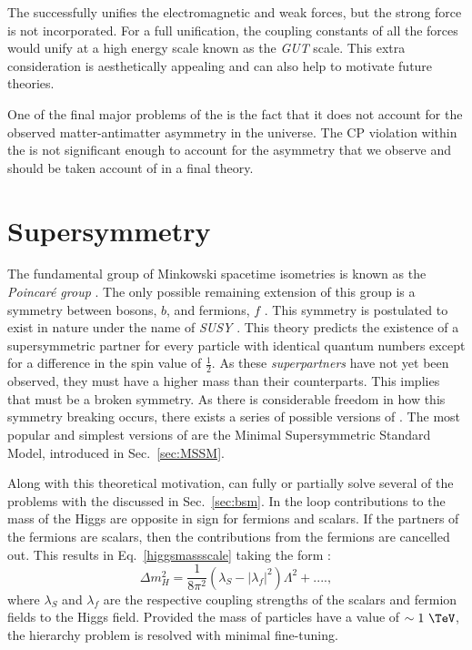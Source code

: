 The \SM successfully unifies the electromagnetic and weak forces, but
the strong force is not incorporated. For a full unification, the
coupling constants of all the \SM forces would unify at a high energy
scale known as the \emph{\acf{GUT}} scale. This extra consideration is
aesthetically appealing and can also help to motivate future \BSM
theories.

One of the final major problems of the \SM is the fact that it does
not account for the observed matter-antimatter asymmetry in the
universe. The \ac{CP} violation within the \SM is not significant
enough to account for the asymmetry that we observe and should be taken
account of in a final \BSM theory.

\section{Supersymmetry}
\label{sec:susy}

The fundamental group of Minkowski spacetime isometries is known as
the \emph{Poincar\'e group} \cite{Poincare1906}. The only possible
remaining extension of this group is a symmetry between bosons, $b$,
and fermions, $f$ \cite{PhysRev.159.1251}. This symmetry is postulated to exist in nature
under the name of \emph{\acf{SUSY}} \cite{Martin:1997ns}. This theory
predicts the existence of a supersymmetric partner for every \SM
particle with identical quantum numbers except for a difference in the
spin value of $\frac{1}{2}$. As these \emph{superpartners} have not
yet been
observed, they must have a higher mass than their \SM
counterparts. This implies that \SUSY must be a broken symmetry. As
there is considerable freedom in how this symmetry breaking occurs,
there exists a series of possible versions of \SUSY. The most popular
and simplest versions of \SUSY are the Minimal Supersymmetric
Standard Model, introduced in
Sec.~\ref{sec:MSSM}.

Along with this theoretical motivation, \SUSY can fully or partially
solve several of the problems with the \SM discussed in
Sec.~\ref{sec:bsm}. In \SUSY the loop contributions to the mass of the
Higgs are opposite in sign for fermions and scalars. If the partners
of the \SM fermions are \SUSY scalars, then the contributions from the
\SM fermions are cancelled out. This results in Eq.~\ref{higgsmassscale} taking the
form \cite{Martin:1997ns}:
\begin{equation}
\Delta m_H^2 = \frac{1}{8\pi^2}(\lambda_S-|\lambda_f|^2)\Lambda^2+....,
\end{equation}
where $\lambda_S$ and $\lambda_f$ are the respective coupling
strengths of the scalars and fermion fields to the Higgs field.
Provided the mass of \SUSY particles have a value of $\sim1~\tev$, the
hierarchy problem is resolved with minimal fine-tuning.

